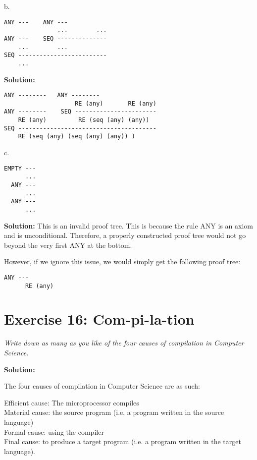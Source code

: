\documentclass{article}
\begin{document}
b.
\begin{lstlisting}[language=vasu]
           ANY ---    ANY ---
               ...        ...
ANY ---    SEQ --------------
    ...        ...
SEQ -------------------------
    ...
\end{lstlisting}


\noindent \textbf{Solution:}
\begin{lstlisting}[language=vasu]
                ANY --------   ANY --------
                    RE (any)       RE (any)
ANY --------    SEQ -----------------------
    RE (any)         RE (seq (any) (any))
SEQ ---------------------------------------
    RE (seq (any) (seq (any) (any)) )
\end{lstlisting}


c.
\begin{lstlisting}[language=vasu]
EMPTY ---
      ...
  ANY ---
      ...
  ANY ---
      ...
\end{lstlisting}


\noindent \textbf{Solution:} \linebreak \linebreak
This is an invalid proof tree. This is because the rule ANY is an axiom and is unconditional. Therefore, a properly constructed proof tree would not go beyond the very first ANY at the bottom. \linebreak \linebreak

However, if we ignore this issue, we would simply get the following proof tree:
\begin{lstlisting}[language=vasu]
  ANY ---
      RE (any)
\end{lstlisting}
\newpage


\section{Exercise 16: Com-pi-la-tion}

\textit{Write down as many as you like of the four causes of compilation in Computer Science.}\linebreak \linebreak

\noindent \textbf{Solution:} \linebreak \linebreak

The four causes of compilation in Computer Science are as such: 
\begin{tabbing}
Efficient cause: \= The microprocessor compiles\\
Material cause: \> the source program (i.e, a program written in the source language)\\
Formal cause: \> using the compiler\\
Final cause: \> to produce a target program (i.e. a program written in the target language).\\
\end{tabbing}
\end{document}
